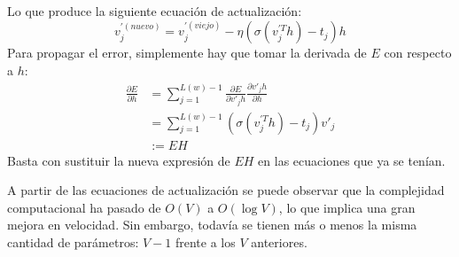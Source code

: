 Lo que produce la siguiente ecuación de actualización:
\begin{equation}
  v^{'(nuevo)}_j = v^{'(viejo)}_j - \eta \left( \sigma\left( v^{'T}_j h \right) - t_j \right)h
\end{equation}
Para propagar el error, simplemente hay que tomar la derivada de $E$ con respecto a $h$:
\begin{align}
  \frac{\partial E }{\partial h} & = \sum_{j=1}^{L(w) - 1}\frac{\partial E}{\partial v'_jh} \frac{\partial v'_jh}{\partial h} \\
                                 & = \sum_{j=1}^{L(w) - 1} \left( \sigma\left( v^{'T}_j h \right) - t_j \right)v'_j \\
                                 & := EH
\end{align}
Basta con sustituir la nueva expresión de $EH$ en las ecuaciones que ya se tenían.

A partir de las ecuaciones de actualización se puede observar que la complejidad computacional ha pasado de $O(V)$ a $O(\log V)$, lo que implica una gran mejora
en velocidad. Sin embargo, todavía se tienen más o menos la misma cantidad de parámetros: $V-1$ frente a los $V$ anteriores.